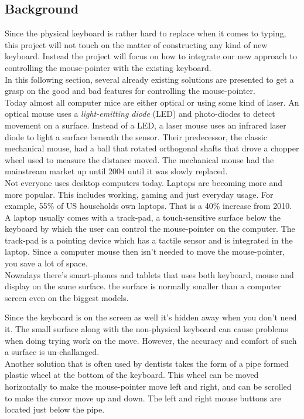 \documentclass[a4paper,11pt]{article}
\begin{document}
\subsection{Background}
Since the physical keyboard is rather hard to replace when it comes to typing, this project
will not touch on the matter of constructing any kind of new keyboard. Instead the project
will focus on how to integrate our new approach to controlling the mouse-pointer with the existing
keyboard.\\
In this following section, several already existing solutions are presented to get a grasp
on the good and bad features for controlling the mouse-pointer.\\
Today almost all computer mice are either optical or using some kind of laser. An optical
mouse uses a \emph{light-emitting diode} (LED) and photo-diodes to detect movement on a
surface. Instead of a LED, a laser mouse uses an infrared laser diode to light a surface
beneath the sensor. Their predecessor, the classic mechanical mouse, had a ball that rotated
orthogonal shafts that drove a chopper wheel used to measure the distance moved. The mechanical
mouse had the mainstream market up until 2004 until it was slowly replaced.\\
Not everyone uses desktop computers today. Laptops are becoming more and more popular.
This includes working, gaming and just everyday usage. For example, 55\% of US households
own laptops. That is a 40\% increase from 2010.\\
A laptop usually comes with a track-pad, a touch-sensitive surface below the keyboard
by which the user can control the mouse-pointer on the computer.
The track-pad is a pointing device which has a tactile sensor and is
integrated in the laptop. Since a computer mouse then isn't needed to move
the mouse-pointer, you save a lot of space.\\
Nowadays there's smart-phones and tablets that uses both keyboard, mouse
and display on the same surface. the surface is normally smaller than a computer screen
even on the biggest models.

Since the keyboard is on the screen as well it's hidden away when you don't need it.
The small surface along with the non-physical keyboard can cause problems when doing
trying work on the move. However, the accuracy and comfort of such a surface is un-challanged.\\
Another solution that is often used by dentists takes the form of a pipe formed plastic wheel
at the bottom of the keyboard. This wheel can be moved horizontally to make the mouse-pointer move
left and right, and can be scrolled to make the cursor move up and down. The left and right mouse
buttons are located just below the pipe.
\end{document}
